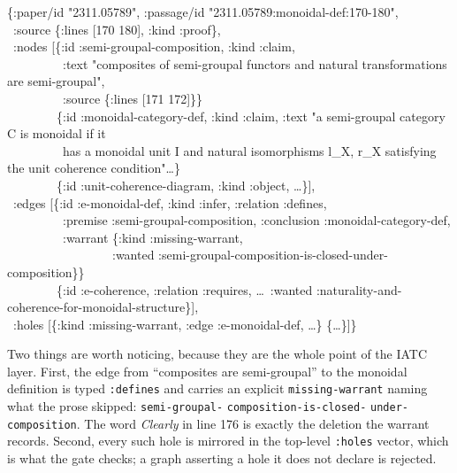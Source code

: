 \begin{center}\small
\begin{minipage}{0.93\textwidth}\ttfamily\raggedright\footnotesize
\{:paper/id "2311.05789", :passage/id "2311.05789:monoidal-def:170-180",\\
\ :source \{:lines [170 180], :kind :proof\},\\
\ :nodes [\{:id :semi-groupal-composition, :kind :claim,\\
\ \ \ \ \ \ \ \ \ :text "composites of semi-groupal functors and natural transformations are semi-groupal",\\
\ \ \ \ \ \ \ \ \ :source \{:lines [171 172]\}\}\\
\ \ \ \ \ \ \ \ \{:id :monoidal-category-def, :kind :claim, :text "a semi-groupal category C is monoidal if it\\
\ \ \ \ \ \ \ \ \ has a monoidal unit I and natural isomorphisms l\_X, r\_X satisfying the unit coherence condition"\dots\}\\
\ \ \ \ \ \ \ \ \{:id :unit-coherence-diagram, :kind :object, \dots\}],\\
\ :edges [\{:id :e-monoidal-def, :kind :infer, :relation :defines,\\
\ \ \ \ \ \ \ \ \ :premise :semi-groupal-composition, :conclusion :monoidal-category-def,\\
\ \ \ \ \ \ \ \ \ :warrant \{:kind :missing-warrant,\\
\ \ \ \ \ \ \ \ \ \ \ \ \ \ \ \ \ :wanted :semi-groupal-composition-is-closed-under-composition\}\}\\
\ \ \ \ \ \ \ \ \{:id :e-coherence, :relation :requires, \dots\ :wanted :naturality-and-coherence-for-monoidal-structure\}],\\
\ :holes [\{:kind :missing-warrant, :edge :e-monoidal-def, \dots\} \{\dots\}]\}
\end{minipage}
\end{center}

Two things are worth noticing, because they are the whole point of the IATC
layer. First, the edge from ``composites are semi-groupal'' to the monoidal
definition is typed \texttt{:defines} and carries an explicit
\texttt{missing-warrant} naming what the prose skipped:
\texttt{semi-groupal-} \texttt{composition-is-closed-} \texttt{under-composition}.
The word \emph{Clearly} in line 176 is exactly the deletion the warrant records.
Second, every such hole is mirrored in the top-level \texttt{:holes} vector,
which is what the gate checks; a graph asserting a hole it does not declare is
rejected.

